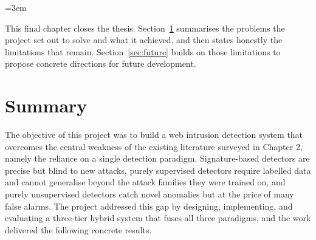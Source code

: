 \documentclass[../main.tex]{subfiles}
\begin{document}
\emergencystretch=3em
\renewcommand{\_}{\textunderscore\allowbreak}
\raggedbottom

This final chapter closes the thesis. Section~\ref{sec:summary} summarises
the problems the project set out to solve and what it achieved, and then
states honestly the limitations that remain. Section~\ref{sec:future} builds
on those limitations to propose concrete directions for future development.

\section{Summary}
\label{sec:summary}

The objective of this project was to build a web intrusion detection system
that overcomes the central weakness of the existing literature surveyed in
Chapter 2, namely the reliance on a single detection
paradigm. Signature-based detectors are precise but blind to new attacks,
purely supervised detectors require labelled data and cannot generalise
beyond the attack families they were trained on, and purely unsupervised
detectors catch novel anomalies but at the price of many false alarms. The
project addressed this gap by designing, implementing, and evaluating a
three-tier hybrid system that fuses all three paradigms, and the work
delivered the following concrete results.
\end{document}
